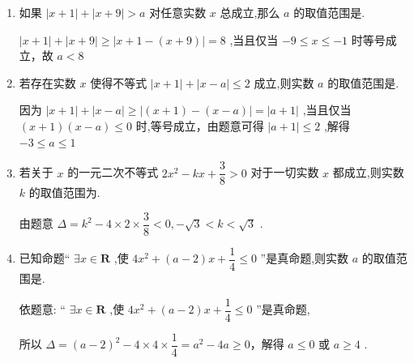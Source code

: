 \begin{enumerate}
\begin{jieda}
        $\dfrac{1}{x} > 1 \Longleftrightarrow x \in (0, 1)$

        $(0, 1) \subset [-1, 1]$，故“ $\left| {x + 1}\right|  + \left| {x - 1}\right|  \leq  2$ ” 是 “ $\dfrac{1}{x} > 1$ ” 的必要不充分条件
    \end{jieda}
    
    \item 如果 $\left| {x + 1}\right|  + \left| {x + 9}\right|  > a$ 对任意实数 $x$ 总成立,那么 $a$ 的取值范围是.
    \begin{jieda}
        $\left| {x + 1}\right|  + \left| {x + 9}\right|  \geq  \left| {x + 1 - \left( {x + 9}\right) }\right|  = 8$ ,当且仅当 $- 9 \leq  x \leq   - 1$ 时等号成立，故 $a < 8$
    \end{jieda}
    \item 若存在实数 $x$ 使得不等式 $\left| {x + 1}\right|  + \left| {x - a}\right|  \leq  2$ 成立,则实数 $a$ 的取值范围是.
    \begin{jieda}
        因为 $\left| {x + 1}\right|  + \left| {x - a}\right|  \geq  \left| {\left( {x + 1}\right)  - \left( {x - a}\right) }\right|  = \left| {a + 1}\right|$ ,当且仅当 $\left( {x + 1}\right) \left( {x - a}\right)  \leq  0$ 时,等号成立，由题意可得 $\left| {a + 1}\right|  \leq  2$ ,解得 $- 3 \leq  a \leq  1$
    \end{jieda}
    \item 若关于 $x$ 的一元二次不等式 $2{x}^{2} - {kx} + \dfrac{3}{8} > 0$ 对于一切实数 $x$ 都成立,则实数 $k$ 的取值范围为.
    \begin{jieda}
        由题意 $\Delta  = {k}^{2} - 4 \times  2 \times  \dfrac{3}{8} < 0, - \sqrt{3} < k < \sqrt{3}$ .
    \end{jieda}
    \item 已知命题“ $\exists x \in  \mathbf{R}$ ,使 $4{x}^{2} + \left( {a - 2}\right) x + \dfrac{1}{4} \leq  0$ ”是真命题,则实数 $a$ 的取值范围是\blkda[4]{$(-\infty, 0] \cup [4, +\infty)$}. 
    \begin{jieda}
        依题意: “ $\exists x \in  \mathbf{R}$ ,使 $4{x}^{2} + \left( {a - 2}\right) x + \dfrac{1}{4} \leq  0$ ”是真命题,
        
        所以 $\Delta  = {\left( a - 2\right) }^{2} - 4 \times  4 \times  \dfrac{1}{4} = {a}^{2} - {4a} \geq  0$，解得 $a \leq  0$ 或 $a \geq  4$ .
    \end{jieda}
\end{enumerate}
